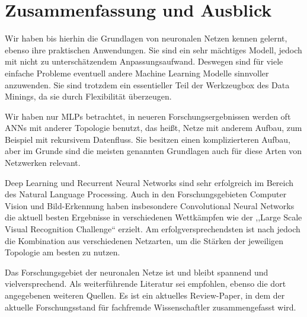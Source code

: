 \section{Zusammenfassung und Ausblick}
Wir haben bis hierhin die Grundlagen von neuronalen Netzen kennen gelernt, ebenso ihre praktischen Anwendungen. 
Sie sind ein sehr mächtiges Modell, jedoch mit nicht zu unterschätzendem Anpassungsaufwand. Deswegen sind für viele einfache Probleme eventuell andere Machine Learning Modelle sinnvoller anzuwenden. Sie sind trotzdem ein essentieller Teil der Werkzeugbox des Data Minings, da sie durch Flexibilität überzeugen. 

Wir haben nur MLPs betrachtet, in neueren Forschungsergebnissen werden oft ANNs mit anderer Topologie benutzt, das heißt, Netze mit anderem Aufbau, zum Beispiel mit rekursivem Datenfluss. Sie besitzen einen komplizierteren Aufbau, aber im Grunde sind die meisten genannten Grundlagen auch für diese Arten von Netzwerken relevant. 

Deep Learning und Recurrent Neural Networks sind sehr erfolgreich im Bereich des Natural Language Processing. Auch in den Forschungsgebieten Computer Vision und Bild-Erkennung haben insbesondere Convolutional Neural Networks die aktuell besten Ergebnisse in verschiedenen Wettkämpfen wie der  ,,Large Scale Visual Recognition Challenge`` erzielt. Am erfolgversprechendsten ist nach \cite{LeCun2015} jedoch die Kombination aus verschiedenen Netzarten, um die Stärken der jeweiligen Topologie am besten zu nutzen. 

Das Forschungsgebiet der neuronalen Netze ist und bleibt spannend und vielversprechend. Als weiterführende Literatur sei \cite{LeCun2015} empfohlen, ebenso die dort angegebenen weiteren Quellen. Es ist ein aktuelles Review-Paper, in dem der aktuelle Forschungsstand für fachfremde Wissenschaftler zusammengefasst wird.

